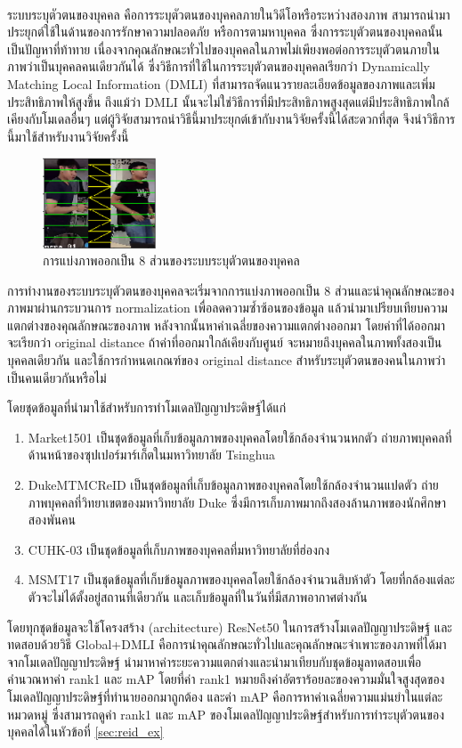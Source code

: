 ระบบระบุตัวตนของบุคคล\textsuperscript{\cite{luo2019alignedreid++}} คือการระบุตัวตนของบุคคลภายในวิดีโอหรือระหว่างสองภาพ สามารถนำมาประยุกต์ใช้ในด้านของการรักษาความปลอดภัย 
หรือการตามหาบุคคล ซึ่งการระบุตัวตนของบุคคลนั้นเป็นปัญหาที่ท้าทาย เนื่องจากคุณลักษณะทั่วไปของบุคคลในภาพไม่เพียงพอต่อการระบุตัวตนภายในภาพว่าเป็นบุคคลคนเดียวกันได้ ซึ่งวิธีการที่ใช้ในการระบุตัวตนของบุคคลเรียกว่า 
Dynamically Matching Local Information (DMLI) ที่สามารถจัดแนวรายละเอียดข้อมูลของภาพและเพิ่มประสิทธิภาพให้สูงขึ้น 
ถึงแม้ว่า DMLI นั้นจะไม่ใช่วิธีการที่มีประสิทธิภาพสูงสุดแต่มีประสิทธิภาพใกล้เคียงกับโมเดลอื่นๆ แต่ผู้วิจัยสามารถนำวิธีนี้มาประยุกต์เข้ากับงานวิจัยครั้งนี้ได้สะดวกที่สุด จึงนำวิธีการนี้มาใช้สำหรับงานวิจัยครั้งนี้

\begin{figure}[!ht]
	\centering
	\includegraphics[width=0.3\textwidth]{chapter2/images/alignedreid.png}
		\caption{การแบ่งภาพออกเป็น 8 ส่วนของระบบระบุตัวตนของบุคคล}
    	\label{fig:alignedreid}
\end{figure}
\clearpage
การทำงานของระบบระบุตัวตนของบุคคลจะเริ่มจากการแบ่งภาพออกเป็น 8 ส่วนและนำคุณลักษณะของภาพมาผ่านกระบวนการ normalization เพื่อลดความซ้ำซ้อนของข้อมูล 
แล้วนำมาเปรียบเทียบความแตกต่างของคุณลักษณะของภาพ หลังจากนั้นหาค่าเฉลี่ยของความแตกต่างออกมา โดยค่าที่ได้ออกมาจะเรียกว่า original distance ถ้าค่าที่ออกมาใกล้เคียงกับศูนย์
จะหมายถึงบุคคลในภาพทั้งสองเป็นบุคคลเดียวกัน และใช้การกำหนดเกณฑ์ของ original distance สำหรับระบุตัวตนของคนในภาพว่าเป็นคนเดียวกันหรือไม่

โดยชุดข้อมูลที่นำมาใช้สำหรับการทำโมเดลปัญญาประดิษฐ์ได้แก่
\begin{enumerate}
	\item{Market1501 เป็นชุดข้อมูลที่เก็บข้อมูลภาพของบุคคลโดยใช้กล้องจำนวนหกตัว ถ่ายภาพบุคคลที่ด้านหน้าของซุปเปอร์มาร์เก็ตในมหาวิทยาลัย Tsinghua}
	\item{DukeMTMCReID เป็นชุดข้อมูลที่เก็บข้อมูลภาพของบุคคลโดยใช้กล้องจำนวนแปดตัว ถ่ายภาพบุคคลที่วิทยาเขตของมหาวิทยาลัย Duke ซึ่งมีการเก็บภาพมากถึงสองล้านภาพของนักศึกษาสองพันคน }
	\item{CUHK-03 เป็นชุดข้อมูลที่เก็บภาพของบุคคลที่มหาวิทยาลัยที่ฮ่องกง}
	\item{MSMT17 เป็นชุดข้อมูลที่เก็บข้อมูลภาพของบุคคลโดยใช้กล้องจำนวนสิบห้าตัว โดยที่กล้องแต่ละตัวจะไม่ได้ตั้งอยู่สถานที่เดียวกัน และเก็บข้อมูลที่ในวันที่มีสภาพอากาศต่างกัน}
\end{enumerate}

โดยทุกชุดข้อมูลจะใช้โครงสร้าง (architecture) ResNet50 ในการสร้างโมเดลปัญญาประดิษฐ์ และทดสอบด้วยวิธี Global+DMLI คือการนำคุณลักษณะทั่วไปและคุณลักษณะจำเพาะของภาพที่ได้มาจากโมเดลปัญญาประดิษฐ์ นำมาหาค่าระยะความแตกต่างและนำมาเทียบกับชุดข้อมูลทดสอบเพื่อคำนวณหาค่า rank1 และ mAP โดยที่ค่า rank1 หมายถึงค่าอัตราร้อยละของความมั่นใจสูงสุดของโมเดลปัญญาประดิษฐ์ที่ทำนายออกมาถูกต้อง 
และค่า mAP คือการหาค่าเฉลี่ยความแม่นยำในแต่ละหมวดหมู่ ซึ่งสามารถดูค่า rank1 และ mAP ของโมเดลปัญญาประดิษฐ์สำหรับการทำระบุตัวตนของบุคคลได้ในหัวข้อที่ \ref{sec:reid_ex}